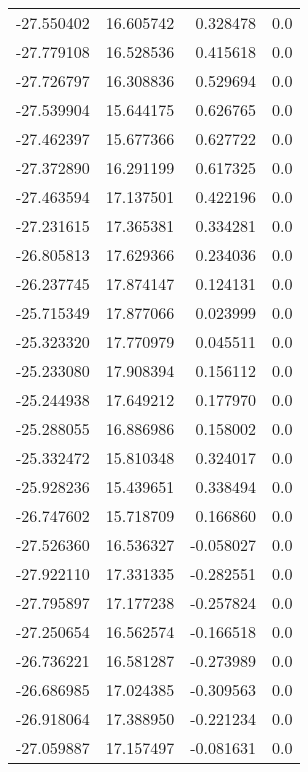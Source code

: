 \begin{tabular}{rrrr}
      -27.550402 &        16.605742 &    0.328478 &   0.0 \\
      -27.779108 &        16.528536 &    0.415618 &   0.0 \\
      -27.726797 &        16.308836 &    0.529694 &   0.0 \\
      -27.539904 &        15.644175 &    0.626765 &   0.0 \\
      -27.462397 &        15.677366 &    0.627722 &   0.0 \\
      -27.372890 &        16.291199 &    0.617325 &   0.0 \\
      -27.463594 &        17.137501 &    0.422196 &   0.0 \\
      -27.231615 &        17.365381 &    0.334281 &   0.0 \\
      -26.805813 &        17.629366 &    0.234036 &   0.0 \\
      -26.237745 &        17.874147 &    0.124131 &   0.0 \\
      -25.715349 &        17.877066 &    0.023999 &   0.0 \\
      -25.323320 &        17.770979 &    0.045511 &   0.0 \\
      -25.233080 &        17.908394 &    0.156112 &   0.0 \\
      -25.244938 &        17.649212 &    0.177970 &   0.0 \\
      -25.288055 &        16.886986 &    0.158002 &   0.0 \\
      -25.332472 &        15.810348 &    0.324017 &   0.0 \\
      -25.928236 &        15.439651 &    0.338494 &   0.0 \\
      -26.747602 &        15.718709 &    0.166860 &   0.0 \\
      -27.526360 &        16.536327 &   -0.058027 &   0.0 \\
      -27.922110 &        17.331335 &   -0.282551 &   0.0 \\
      -27.795897 &        17.177238 &   -0.257824 &   0.0 \\
      -27.250654 &        16.562574 &   -0.166518 &   0.0 \\
      -26.736221 &        16.581287 &   -0.273989 &   0.0 \\
      -26.686985 &        17.024385 &   -0.309563 &   0.0 \\
      -26.918064 &        17.388950 &   -0.221234 &   0.0 \\
      -27.059887 &        17.157497 &   -0.081631 &   0.0 \\

\end{tabular}
